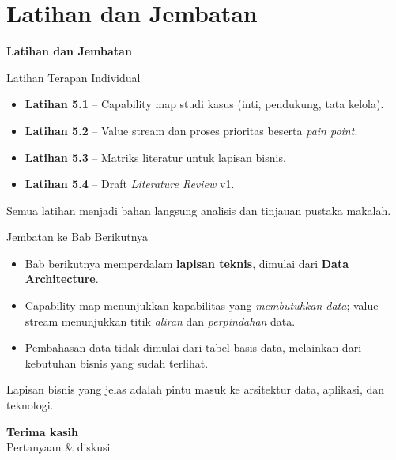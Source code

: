 \documentclass[aspectratio=169, table]{beamer}
\newcommand{\sectionframe}[1]{%
  \begin{frame}{\hfill}
    \centering
    \Huge{\textbf{#1}}
  \end{frame}
}
\newcommand{\takeaway}[1]{%
  \vspace{4pt}
  {\footnotesize #1}
}
\begin{document}
\section{Latihan dan Jembatan}
\sectionframe{Latihan dan Jembatan}

\begin{frame}{Latihan Terapan Individual}
  \vspace{8pt}
  \begin{itemize}
    \item \textbf{Latihan 5.1} -- Capability map studi kasus (inti, pendukung,
          tata kelola).
    \item \textbf{Latihan 5.2} -- Value stream dan proses prioritas beserta
          \emph{pain point}.
    \item \textbf{Latihan 5.3} -- Matriks literatur untuk lapisan bisnis.
    \item \textbf{Latihan 5.4} -- Draft \emph{Literature Review} v1.
  \end{itemize}
  \takeaway{Semua latihan menjadi bahan langsung analisis dan tinjauan pustaka
  makalah.}
\end{frame}

\begin{frame}{Jembatan ke Bab Berikutnya}
  \vspace{8pt}
  \begin{itemize}
    \item Bab berikutnya memperdalam \textbf{lapisan teknis}, dimulai dari
          \textbf{Data Architecture}.
    \item Capability map menunjukkan kapabilitas yang \emph{membutuhkan data};
          value stream menunjukkan titik \emph{aliran} dan \emph{perpindahan}
          data.
    \item Pembahasan data tidak dimulai dari tabel basis data, melainkan dari
          kebutuhan bisnis yang sudah terlihat.
  \end{itemize}
  \takeaway{Lapisan bisnis yang jelas adalah pintu masuk ke arsitektur data,
  aplikasi, dan teknologi.}
\end{frame}

\begin{frame}{\hfill}
  \centering
  \Huge{\textbf{Terima kasih}}\\[8pt]
  \normalsize Pertanyaan \& diskusi
\end{frame}
\end{document}
